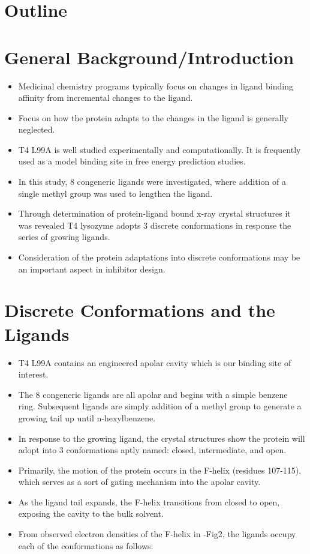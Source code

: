 \documentclass{article}
\begin{document}
\pagebreak
\section*{Outline}
\section{General Background/Introduction}
   \begin{itemize}
   \item Medicinal chemistry programs typically focus on changes in ligand binding affinity from incremental changes to the ligand.
   \item Focus on how the protein adapts to the changes in the ligand is generally neglected.
   \item T4 L99A is well studied experimentally and computationally. It is frequently used as a model binding site in free energy prediction studies.
   \item In this study, 8 congeneric ligands were investigated, where addition of a single methyl group was used to lengthen the ligand.
   \item Through determination of protein-ligand bound x-ray crystal structures it was revealed T4 lysozyme adopts 3 discrete conformations in response the series of growing ligands.
   \item Consideration of the protein adaptations into discrete conformations may be an important aspect in inhibitor design.
   \end{itemize}

\section{Discrete Conformations and the Ligands}
   \begin{itemize}
   \item T4 L99A contains an engineered apolar cavity which is our binding site of interest.
   \item The 8 congeneric ligands are all apolar and begins with a simple benzene ring. Subsequent ligands are simply addition of a methyl group to generate a growing tail up until n-hexylbenzene.
   \item In response to the growing ligand, the crystal structures show the protein will adopt into 3 conformations aptly named: closed, intermediate, and open.
   \item Primarily, the motion of the protein occurs in the F-helix (residues 107-115), which serves as a sort of gating mechanism into the apolar cavity.
   \item As the ligand tail expands, the F-helix transitions from closed to open, exposing the cavity to the bulk solvent.
   \item From observed electron densities of the F-helix in \cite{Merski2015}-Fig2, the ligands occupy each of the conformations as follows:
   \end{itemize}
   
\end{document}
